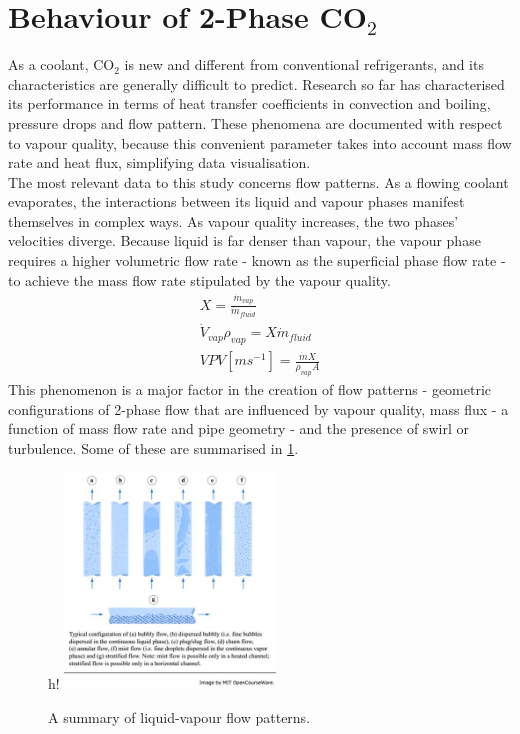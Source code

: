 \documentclass{report}
\begin{document}
\section{Behaviour of 2-Phase CO$_2$} \label{behaviour}
As a coolant, CO$_2$ is new and different from conventional refrigerants, and its characteristics are generally difficult to predict. Research so far has characterised its performance in terms of heat transfer coefficients in convection and boiling, pressure drops and flow pattern.\cite{Mastrullo 2010}\cite{Cheng 2008}\cite{Yun 2005}\cite{Wu 2011} These phenomena are documented with respect to vapour quality, because this convenient parameter takes into account mass flow rate and heat flux, simplifying data visualisation. \\
The most relevant data to this study concerns flow patterns. As a flowing coolant evaporates, the interactions between its liquid and vapour phases manifest themselves in complex ways. As vapour quality increases, the two phases' velocities diverge. Because liquid is far denser than vapour, the vapour phase requires a higher volumetric flow rate - known as the superficial phase flow rate - to achieve the mass flow rate stipulated by the vapour quality. \\
\begin{eqnarray}
X=\frac{\dot{m}_{vap}}{\dot{m}_{fluid}}\\
\dot{V}_{vap}\rho_{vap}=X\dot{m}_{fluid}\\
VPV[ms^{-1}]=\frac{\dot{m}X}{\rho_{vap}A}
\end{eqnarray}
This phenomenon is a major factor in the creation of flow patterns - geometric configurations of 2-phase flow that are influenced by vapour quality, mass flux - a function of mass flow rate and pipe geometry - and the presence of swirl or turbulence. Some of these are summarised in \ref{fig:flowPatterns}. 
\FloatBarrier
\begin{figure}{h!}
\includegraphics[width=0.5\textwidth]{flowPatterns}
\caption{A summary of liquid-vapour flow patterns. \cite{MIT}}
\label{fig:flowPatterns}
\end{figure}
\end{document}
